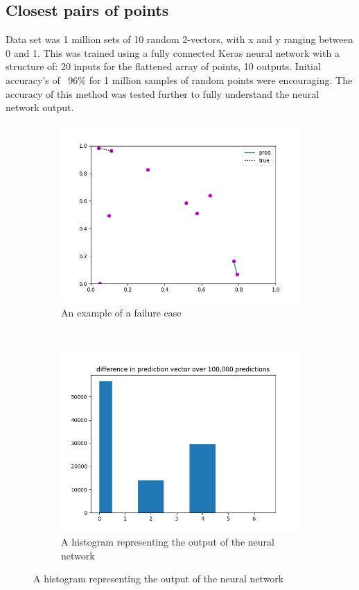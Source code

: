 \subsection{Closest pairs of points}
Data set was 1 million sets of 10 random 2-vectors, with x and y ranging between 0 and 1. This was trained using a fully connected Keras neural network with a structure of: 20 inputs for the flattened array of points, 10 outputs.
Initial accuracy's of ~96\% for 1 million samples of random points were encouraging.
The accuracy of this method was tested further to fully understand the neural network output.

\begin{figure}[h] %
\centering
\begin{subfigure}[t]{0.45\textwidth}
\centering
\includegraphics[width=\textwidth]{Figs/closest_dist_fail2}
\caption{An example of a failure case} 
\label{fig:closest_dist_fail2} 
\end{subfigure}
~
\begin{subfigure}[t]{0.45\textwidth}
\includegraphics[width=\textwidth]{Figs/pred_dif_hist}
\caption{A histogram representing the output of the neural network} 
\label{fig:pred_dif_hist}
\end{subfigure}
\end{figure}

